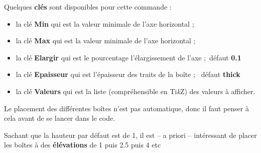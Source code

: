 \documentclass[a4paper,french,11pt]{article}
\providecommand\tikzlogo{Ti\textit{k}Z}
\let\TikZ\tikzlogo
\newcommand\Cle[1]{{\bfseries\sffamily\textlangle \textcolor{orange!75!black}{#1}\textrangle}}
\begin{document}
\begin{PresCodePL}{}
\end{PresCodePL}

\begin{PresCodePL}{}
\end{PresCodePL}

\begin{cautionblock}
Quelques \Cle{clés} sont disponibles pour cette commande :

\begin{itemize}
	\item la clé \Cle{Min} qui est la valeur minimale de l'axe horizontal ;
	\item la clé \Cle{Max} qui est la valeur minimale de l'axe horizontal ;
	\item la clé \Cle{Elargir} qui est le pourcentage l'élargissement de l'axe ;\hfill~défaut \Cle{0.1}
	\item la clé \Cle{Epaisseur} qui est l'épaisseur des traits de la boîte ; \hfill~défaut \Cle{thick}
	\item la clé \Cle{Valeurs} qui est la liste (compréhensible en \TikZ) des valeurs à afficher.
\end{itemize}
\vspace*{-\baselineskip}\leavevmode
\end{cautionblock}

\begin{PresCodePL}{}
\end{PresCodePL}

\begin{noteblock}
Le placement des différentes boîtes n'est pas automatique, donc il faut penser à cela avant de se lancer dans le code.

Sachant que la hauteur par défaut est de 1, il est -- a priori -- intéressant de placer les boîtes à des \Cle{élévations} de \num{1} puis \num{2.5} puis \num{4} etc
\end{noteblock}
\end{document}
